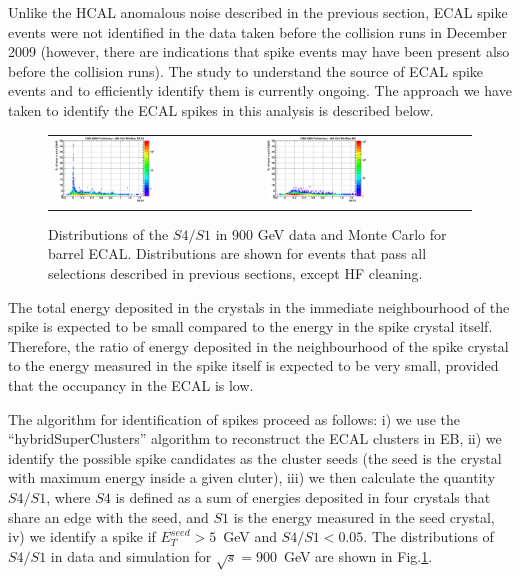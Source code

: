 Unlike the HCAL anomalous noise described in the previous section, ECAL
spike events were not identified in the data taken before the collision runs
in December 2009 (however, there are indications that spike events may
have been present also before the collision runs). The study to understand the
source of ECAL spike events and to efficiently identify them is
currently ongoing. The approach we have taken to identify the ECAL
spikes in this analysis is described below.

\begin{figure}[h]
 \centering
 \begin{tabular}{ll}
\includegraphics[width=0.5\textwidth]{plots_ecalnoise/ECalSeedET_Vs_S4_DATA900GeV.eps}&
\includegraphics[width=0.5\textwidth]{plots_ecalnoise/ECalSeedET_Vs_S4_MC900GeV.eps}\\
 \end{tabular}
\caption{Distributions of the $S4/S1$ in 900 GeV data and Monte Carlo
  for barrel ECAL. Distributions are shown for events that pass all
  selections described in previous sections, except HF cleaning.}
\label{fig:ecal_noise_1}
\end{figure}

The total energy deposited in the crystals in the immediate
neighbourhood of the spike is expected to be small compared to the
energy in the spike crystal itself. Therefore, the ratio of energy
deposited in the neighbourhood of the spike crystal to the energy
measured in the spike itself is expected to be very small, provided 
that the occupancy in the ECAL is low.

The algorithm for identification of spikes proceed as follows: 
i) we use the ``hybridSuperClusters'' algorithm to reconstruct the ECAL
clusters in EB, ii) we identify the possible spike candidates as the cluster seeds  
(the seed is the crystal with maximum energy inside a given cluter),
iii) we then calculate the quantity $S4/S1$, where $S4$ is defined as 
a sum of energies deposited in four crystals that share an edge with the seed, 
and $S1$ is the energy measured in the seed crystal, iv) we identify a spike
if $E_T^{seed}>5$~GeV and $S4/S1<0.05$.
The distributions of $S4/S1$ in data and
simulation for $\sqrt{s}=900$~GeV are shown in Fig.\ref{fig:ecal_noise_1}. 

